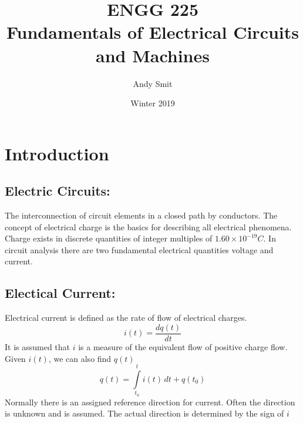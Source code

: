 \documentclass[14pt]{article}
\author{Andy Smit}
\title{ENGG 225\\Fundamentals of Electrical Circuits and Machines}
\date{Winter 2019}
\begin{document}
    \maketitle
    \section{Introduction}
    \subsection{Electric Circuits:}
    The interconnection of circuit elements in a closed path by conductors. 
    The concept of electrical charge is the basics for describing all electrical phenomena. Charge exists in discrete quantities of integer multiples of $1.60\times 10^{-19}C$. In circuit analysis there are two fundamental electrical quantities voltage and current. 
    \subsection{Electical Current:}
    Electrical current is defined as the rate of flow of electrical charges.
    $$i(t)=\frac{d q(t)}{dt}$$
    It is assumed that $i$ is a measure of the equivalent flow of positive charge flow. Given $i(t)$, we can also find $q(t)$
    $$q(t)=\int\limits_{t_0}^t i(t)\, dt+q(t_0)$$
    Normally there is an assigned reference direction for current. Often the direction is unknown and is assumed. The actual direction is determined by the sign of $i$
\end{document}
